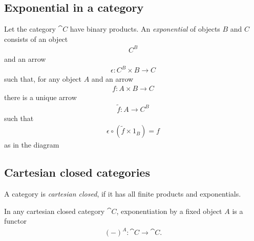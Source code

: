 \documentclass{article}
\begin{document}
\subsection{Exponential in a category}

\begin{definition}[Awodey p. 121]
	Let the category $\cat C$ have binary products. An \emph{exponential}
	of objects $B$ and $C$ consists of an object
	\begin{align*}
		C^B
	\end{align*}
	and an arrow
	\begin{align*}
		\epsilon:C^B\times B \to C
	\end{align*}
	such that, for any object $A$ and an arrow
	\begin{align*}
		f:A\times B\to C
	\end{align*}
	there is a unique arrow
	\begin{align*}
		\tilde f:A\to C^B
	\end{align*}
	such that
	\begin{align*}
		\epsilon \circ (\tilde f\times 1_B) = f
	\end{align*}
	as in the diagram
	\begin{center}
	\end{center}
\end{definition}

\subsection{Cartesian closed categories}

\begin{definition}[Awodey p. 122]
	A category is \emph{cartesian closed}, if it has all finite
	products and exponentials.
\end{definition}

\begin{proposition}[Awodey p. 126]
	In any cartesian closed category $\cat C$, exponentiation by a
	fixed object $A$ is a functor
	\begin{align*}
		(-)^A:\cat C\to\cat C.
	\end{align*}
\end{proposition}
\end{document}
